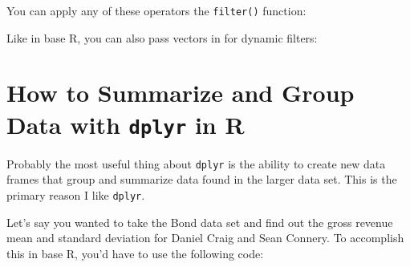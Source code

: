 \documentclass[
]{book}
\newenvironment{Shaded}{\begin{snugshade}}{\end{snugshade}}
\newcommand{\DecValTok}[1]{\textcolor[rgb]{0.00,0.00,0.81}{#1}}
\newcommand{\KeywordTok}[1]{\textcolor[rgb]{0.13,0.29,0.53}{\textbf{#1}}}
\newcommand{\NormalTok}[1]{#1}
\newcommand{\OperatorTok}[1]{\textcolor[rgb]{0.81,0.36,0.00}{\textbf{#1}}}
\newcommand{\StringTok}[1]{\textcolor[rgb]{0.31,0.60,0.02}{#1}}
\begin{document}
\begin{center}
You can apply any of these operators the \texttt{filter()} function:

\begin{Shaded}
\end{Shaded}

Like in base R, you can also pass vectors in for dynamic filters:

\begin{Shaded}
\end{Shaded}

\hypertarget{how-to-summarize-and-group-data-with-dplyr-in-r}{%
\section{\texorpdfstring{How to Summarize and Group Data with \texttt{dplyr} in R}{How to Summarize and Group Data with dplyr in R}}\label{how-to-summarize-and-group-data-with-dplyr-in-r}}

Probably the most useful thing about \texttt{dplyr} is the ability to create new data frames that group and summarize data found in the larger data set. This is the primary reason I like \texttt{dplyr}.

Let's say you wanted to take the Bond data set and find out the gross revenue mean and standard deviation for Daniel Craig and Sean Connery. To accomplish this in base R, you'd have to use the following code:


\end{center}
\end{document}
